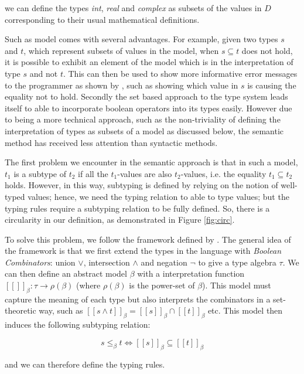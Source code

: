 \documentclass{l4proj}
\begin{document}
we can define the types \emph{int}, \emph{real} and \emph{complex} as subsets of the values in $D$ corresponding to their usual mathematical definitions.

Such as model comes with several advantages.
For example, given two types $s$ and $t$, which represent subsets of values in the model, when $s \subseteq t$ does not hold, it is possible to exhibit an element of the model which is in the interpretation of type $s$ and not $t$.
This can then be used to show more informative error messages to the programmer as shown by \citet{Castagna2005}, such as showing which value in $s$ is causing the equality not to hold.
Secondly the set based approach to the type system leads itself to able to incorporate boolean operators into its types easily.
However due to being a more technical approach, such as the non-triviality of defining the interpretation of types as subsets of a model as discussed below, the semantic method has received less attention than syntactic methods.

The first problem we encounter in the semantic approach is that in such a model, $t_{1}$ is a subtype of $t_{2}$ if all the $t_{1}$-values are also $t_{2}$-values, i.e. the equality $t_{1} \subseteq t_{2}$ holds.
However, in this way, subtyping is defined by relying on the notion of well-typed values; hence, we need the typing relation to able to type values; but the typing rules require a subtyping relation to be fully defined.
So, there is a circularity in our definition, as demonstrated in Figure \ref{fig:circ}.

To solve this problem, we follow the framework defined by \citet{Frisch2008}.
The general idea of the framework is that we first extend the types in the language with \emph{Boolean Combinators}: union $\lor$, intersection $\land$ and negation $\neg$ to give a type algebra $\tau$.
We can then define an abstract model $\beta$ with a interpretation function $[\![ ]\!]_{\beta} : \tau \to \rho(\beta)$ (where $\rho(\beta)$ is the power-set of $\beta$).
This model must capture the meaning of each type but also interprets the combinators in a set-theoretic way, such as $[\![s \land t]\!]_{\beta} = [\![s]\!]_{\beta} \cap [\![t]\!]_{\beta}$ etc.
This model then induces the following subtyping relation:

\begin{equation*}
    s \leq_{\beta} t \iff [\![s]\!]_{\beta} \subseteq [\![t]\!]_{\beta}
\end{equation*}

and we can therefore define the typing rules.
\end{document}
